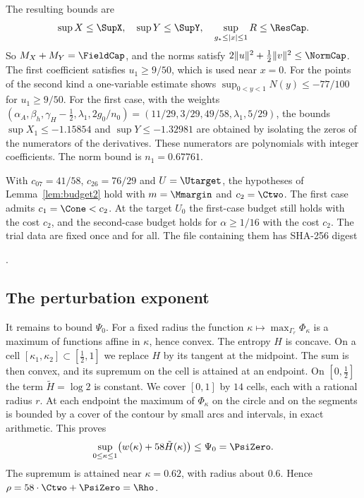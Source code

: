 The resulting bounds are
\[
 \sup X\le\SupX,\quad \sup Y\le\SupY,\quad \sup_{g_*\le|x|\le1}R\le\ResCap .
\]
So $M_X+M_Y=\FieldCap$, and the norms satisfy $2\|u\|^2+\frac12\|v\|^2\le\NormCap$. The first coefficient
satisfies $u_1\ge9/50$, which is used near $x=0$. For the points of the second kind a one-variable estimate
shows $\sup_{0<y<1}N(y)\le-77/100$ for $u_1\ge9/50$. For the first case, with the weights
$(\alpha_A,\beta_h,\gamma_H-\frac12,\lambda_1,2g_0/n_0)=(11/29,3/29,49/58,\lambda_1,5/29)$, the bounds
$\sup X_1\le-1.15854$ and $\sup Y\le-1.32981$ are obtained by isolating the zeros of the numerators of the
derivatives. These numerators are polynomials with integer coefficients. The norm bound is $n_1=0.67761$.

With $c_{07}=41/58$, $c_{26}=76/29$ and $U=\Utarget$, the hypotheses of Lemma~\ref{lem:budget2} hold with
$m=\Mmargin$ and $c_2=\Ctwo$. The first case admits $c_1=\Cone<c_2$. At the target $U_0$ the first-case
budget still holds with the cost $c_2$, and the second-case budget holds for $\alpha\ge1/16$ with the cost
$c_2$. The trial data are fixed once and for all. The file containing them has SHA-256 digest
\begin{center}
{\footnotesize\texttt{\Digest}}.
\end{center}

\subsection{The perturbation exponent}\label{ssec:rho}
It remains to bound $\Psi_0$. For a fixed radius the function $\kappa\mapsto\max_{\Gamma_r}\Phi_\kappa$ is a
maximum of functions affine in $\kappa$, hence convex. The entropy $H$ is concave. On a cell
$[\kappa_1,\kappa_2]\subset[\frac12,1]$ we replace $H$ by its tangent at the midpoint. The sum is then
convex, and its supremum on the cell is attained at an endpoint. On $[0,\frac12]$ the term $\tilde H=\log2$
is constant. We cover $[0,1]$ by $14$ cells, each with a rational radius $r$. At each endpoint the maximum of
$\Phi_\kappa$ on the circle and on the segments is bounded by a cover of the contour by small arcs and
intervals, in exact arithmetic. This proves
\[
 \sup_{0\le\kappa\le1}\bigl(w(\kappa)+58\tilde H(\kappa)\bigr)\le\Psi_0=\PsiZero .
\]
The supremum is attained near $\kappa=0.62$, with radius about $0.6$. Hence $\rho=58\cdot\Ctwo+\PsiZero=\Rho$.
